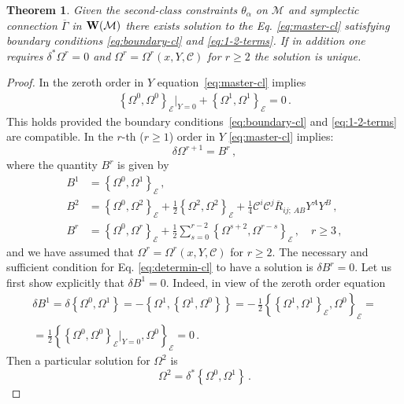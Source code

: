 \documentclass[a4paper,11pt]{amsart}
\newtheorem{thm}{Theorem}
\numberwithin{thm}{section} %
\numberwithin{equation}{section} %
\numberwithin{figure}{section} %
\newcommand{\pb}[2]{\left\{{}#1{},{}#2{}\right\}}
\renewcommand{\:}{{\rm\, :\,}}
\def\bar{\overline}
\def\half{{\frac{1}{2}}}
\def\cc{{\mathcal C}}
\def\manM{{\mathcal M}}
\def\E{{ \mathcal E}}
\def\W{{\bf W}}
\def\con{{\bar\Gamma}}
\begin{document}
\begin{thm}\label{thm:existence-cl}
Given the second-class constraints $\theta_\alpha$ on $\manM$ and
symplectic connection $\con$ in $\W(\manM)$ there exists solution to
the Eq. \eqref{eq:master-cl} satisfying boundary conditions
\eqref{eq:boundary-cl} and \eqref{eq:1-2-terms}.  If in addition one
requires $\delta^*\Omega^r=0$ and $\Omega^r=\Omega^r(x,Y,\cc)$ for $r
\geq 2$ the solution is unique.
\end{thm}
\begin{proof}
In the zeroth order in $Y$ equation~\eqref{eq:master-cl}
implies
\begin{equation}
\begin{split}
\pb{\Omega^0}{\Omega^0}_\E |_{Y=0} +\pb{\Omega^1}{\Omega^1}_\E=0\,.
\end{split}
\end{equation}
This holds provided the boundary conditions~\eqref{eq:boundary-cl} and
\eqref{eq:1-2-terms} are compatible.  In the $r$-th ($r \geq 1$) order
in $Y$
\eqref{eq:master-cl} implies:
\begin{equation}
\label{eq:determin-cl}
\delta\Omega^{r+1}=B^r\,,
\end{equation}
where the quantity $B^r$ is given by
\begin{equation}
  \label{eq:B-explicit}
  \begin{split}
B^1&=\pb{\Omega^0}{\Omega^1}_\E\,,\\[3pt]
B^2&=\pb{\Omega^0}{\Omega^2}_\E
+\half \pb{\Omega^2}{\Omega^2}_\E+
\frac{1}{4}\cc^i \cc^j  {\bar R}_{ij;\, A B} Y^A Y^B\,,\\
B^r&=\pb{\Omega^0}{\Omega^r}_\E+\half\sum_{s=0}^{r-2}
\pb{\Omega^{s+2}}{\Omega^{r-s}}_\E\,,\quad r\geq 3\,,
\end{split}
\end{equation}
and we have assumed that $\Omega^r=\Omega^r(x,Y,\cc)$ for $r\geq 2$.
The necessary and sufficient condition for Eq. \eqref{eq:determin-cl}
to have a solution is $\delta B^r=0$. Let us first show explicitly that
$\delta B^1=0$. Indeed, in view of the zeroth order equation
\begin{equation}
  \begin{split}
\delta B^1=\delta\pb{\Omega^0}{\Omega^1}=-\pb{\Omega^1}{\pb{\Omega^1}{\Omega^0}}=
{-\, \frac{1}{2}}\pb{\pb{\Omega^1}{\Omega^1}_\E}{\Omega^0}_\E=\\
=\half\pb{\pb{\Omega^0}{\Omega^0}_\E{\bigr|}_{Y=0}}{\Omega^0}_\E=0\,.
\end{split}
\end{equation}
Then a particular solution for $\Omega^2$ is
\begin{equation}
  \Omega^2=\delta^*\pb{\Omega^0}{\Omega^1}\,.
\end{equation}


\end{proof}
\end{document}
